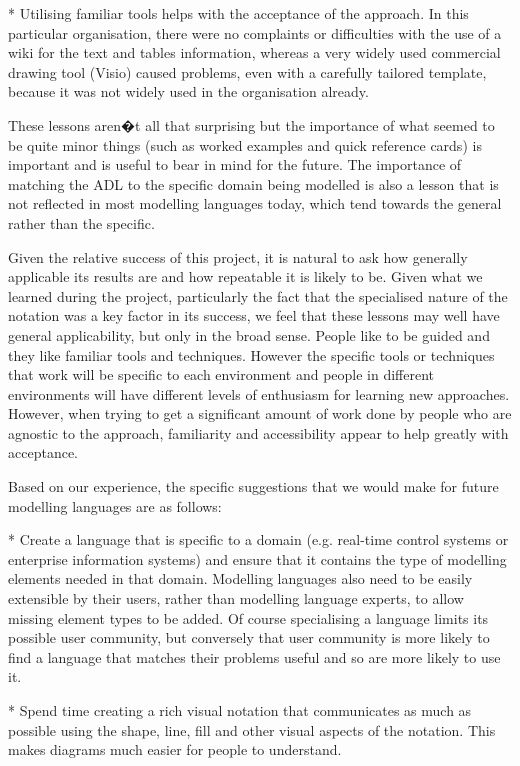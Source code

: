 \begin{itemise}
* Utilising familiar tools helps with the acceptance of the approach.  In this particular organisation, there were no complaints or difficulties with the use of a wiki for the text and tables information, whereas a very widely used commercial drawing tool (Visio) caused problems, even with a carefully tailored template, because it was not widely used in the organisation already.

  These lessons aren�t all that surprising but the importance of what seemed to be quite minor things (such as worked examples and quick reference cards) is important and is useful to bear in mind for the future.  The importance of matching the ADL to the specific domain being modelled is also a lesson that is not reflected in most modelling languages today, which tend towards the general rather than the specific.  

  Given the relative success of this project, it is natural to ask how generally applicable its results are and how repeatable it is likely to be.  Given what we learned during the project, particularly the fact that the specialised nature of the notation was a key factor in its success, we feel that these lessons may well have general applicability, but only in the broad sense.  People like to be guided and they like familiar tools and techniques.  However the specific tools or techniques that work will be specific to each environment and people in different environments will have different levels of enthusiasm for learning new approaches.  However, when trying to get a significant amount of work done by people who are agnostic to the approach, familiarity and accessibility appear to help greatly with acceptance.

  Based on our experience, the specific suggestions that we would make for future modelling languages are as follows:

* Create a language that is specific to a domain (e.g. real-time control systems or enterprise information systems) and ensure that it contains the type of modelling elements needed in that domain.  Modelling languages also need to be easily extensible by their users, rather than modelling language experts, to allow missing element types to be added.  Of course specialising a language limits its possible user community, but conversely that user community is more likely to find a language that matches their problems useful and so are more likely to use it.

* Spend time creating a rich visual notation that communicates as much as possible using the shape, line, fill and other visual aspects of the notation.  This makes diagrams much easier for people to understand.


\end{itemise}
